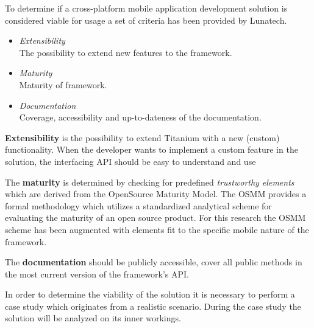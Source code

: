 

To determine if a cross-platform mobile application development solution is considered viable for usage a set of criteria has been provided by Lunatech.
\begin{itemize}
	\item \emph{Extensibility}\\
	The possibility to extend new features to the framework.
	\item \emph{Maturity}\\ 
	Maturity of framework.
	\item \emph{Documentation}\\
	Coverage, accessibility and up-to-dateness of the documentation.
\end{itemize}


{\bf Extensibility} is the possibility to extend Titanium with a new (custom) functionality. 
When the developer wants to implement a custom feature in the solution, the interfacing API should be easy to understand and use

The {\bf maturity} is determined by checking for predefined \emph{trustworthy elements} which are derived from the OpenSource Maturity Model\cite{Wikipedia2011}. The OSMM provides a formal methodology which utilizes a standardized analytical scheme for evaluating the maturity of an open source product. For this research the OSMM scheme has been augmented with elements fit to the specific mobile nature of the framework.

The {\bf documentation} should be publicly accessible, cover all public methods in the most current version of the framework's API.

%
%

In order to determine the viability of the solution it is necessary to perform a case study which originates from a realistic scenario. During the case study the solution will be analyzed on its inner workings. 

